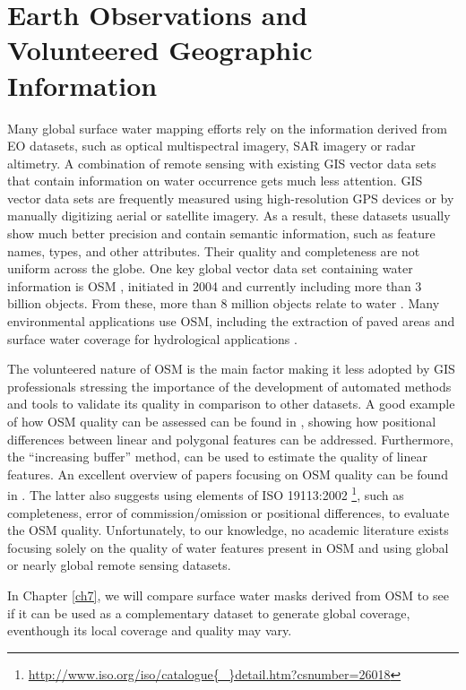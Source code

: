 \section{Earth Observations and Volunteered Geographic Information}
Many global surface water mapping efforts rely on the information derived from \gls{EO} datasets, such as optical multispectral imagery, \gls{SAR} imagery or radar altimetry. A combination of remote sensing with existing GIS vector data sets that contain information on water occurrence gets much less attention. GIS vector data sets are frequently measured using high-resolution GPS devices or by manually digitizing aerial or satellite imagery. As a result, these datasets usually show much better precision and contain semantic information, such as feature names, types, and other attributes. Their quality and completeness are not uniform across the globe. One key global vector data set containing water information is \gls{OSM} \citet{Haklay2010}, initiated in 2004 and currently including more than 3 billion objects. From these, more than 8 million objects relate to water \citet{webOSMTagInfo}. Many environmental applications use \gls{OSM}, including the extraction of paved areas and surface water coverage for hydrological applications \citet{Schellekens2014}. 

The volunteered nature of \gls{OSM} is the main factor making it less adopted by GIS professionals \citet{Mooney2010} stressing the importance of the development of automated methods and tools to validate its quality in comparison to other datasets. A good example of how \gls{OSM} quality can be assessed can be found in \citet{Girres2010}, showing how positional differences between linear and polygonal features can be addressed. Furthermore, the “increasing buffer” method, \citet{Goodchild1997} can be used to estimate the quality of linear features. An excellent overview of papers focusing on \gls{OSM} quality can be found in \citet{Barron2014}. The latter also suggests using elements of ISO 19113:2002 \footnote{\url{http://www.iso.org/iso/catalogue{\_}detail.htm?csnumber=26018}}, such as completeness, error of commission/omission or positional differences, to evaluate the \gls{OSM} quality. Unfortunately, to our knowledge, no academic literature exists focusing solely on the quality of water features present in \gls{OSM} and using global or nearly global remote sensing datasets.

In Chapter \ref{ch7}, we will compare surface water masks derived from \gls{OSM} to see if it can be used as a complementary dataset to generate global coverage, eventhough its local coverage and quality may vary.

